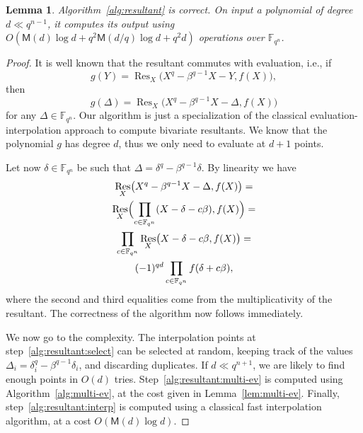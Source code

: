 \documentclass{sig-alternate}
\newcommand{\ff}[1]{\mathbb{F}_{#1}}
\newcommand{\dd}{d}
\newcommand{\qq}{q}
\newcommand{\nn}{n}
\newcommand{\qn}{{\qq^\nn}}
\newcommand{\extf}{\ff{\qn}}
\newcommand{\Mul}{\mathsf{M}}
\DeclareMathOperator{\Res}{Res}
\newcounter{algo}
\newtheorem{Lem}{Lemma}
\begin{document}
\begin{Lem}
  \label{lem:alg-resultant}
  Algorithm~\ref{alg:resultant} is correct. On input a polynomial of
  degree $d\ll\qq^{\nn-1}$, it computes its output using $O(\Mul(\dd)
  \log\dd + \qq^2\Mul(\dd/\qq)\log\dd + \qq^2\dd)$ operations over
  $\extf$.
\end{Lem}
\begin{proof}
  It is well known that the resultant commutes with evaluation, i.e., if
  \begin{equation}
    g(Y) = \Res_X\bigl(X^\qq-\beta^{\qq-1}X-Y,f(X)\bigr),
  \end{equation}
  then
  \begin{equation}
    g(\Delta) = \Res_X\bigl(X^\qq - \beta^{\qq-1}X -\Delta , f(X)\bigr)
  \end{equation}
  for any $\Delta\in\extf$. Our algorithm is just a specialization of
  the classical evaluation-interpolation approach to compute bivariate
  resultants. We know that the polynomial $g$ has degree $\dd$, thus
  we only need to evaluate at $d+1$ points.

  Let now $\delta\in\extf$ be such that
  $\Delta=\delta^\qq-\beta^{\qq-1}\delta$. By linearity we have
  \begin{multline}
    \label{eq:lin-resultant}
    \Res_X\bigl(X^\qq-\beta^{\qq-1}X-\Delta,f(X)\bigr) =\\
    \Res_X\Bigl(  \prod_{c\in\extf}(X-\delta - c\beta),f(X) \Bigr) =\\
    \prod_{c\in\extf} \Res_X\bigl(X-\delta - c\beta, f(X)\bigr) =\\
    (-1)^{\qq\dd} \prod_{c\in\extf} f(\delta+c\beta),
  \end{multline}
  where the second and third equalities come from the
  multiplicativity of the resultant. The correctness of the algorithm
  now follows immediately.

  We now go to the complexity. The interpolation points at
  step~\ref{alg:resultant:select} can be selected at random, keeping
  track of the values $\Delta_i=\delta_i^\qq-\beta^{\qq-1}\delta_i$,
  and discarding duplicates. If $\dd\ll\qq^{n+1}$, we are likely to
  find enough points in $O(d)$
  tries. Step~\ref{alg:resultant:multi-ev} is computed using
  Algorithm~\ref{alg:multi-ev}, at the cost given in
  Lemma~\ref{lem:multi-ev}. Finally, step~\ref{alg:resultant:interp}
  is computed using a classical fast interpolation algorithm, at a
  cost $O(\Mul(d)\log d)$.
\end{proof}
\end{document}
